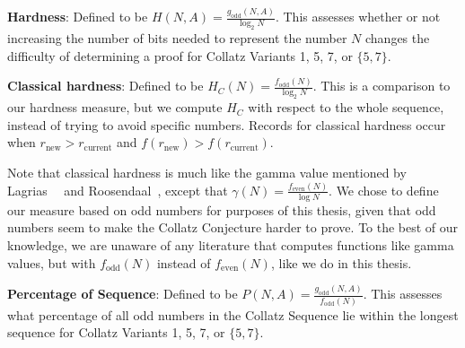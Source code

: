 \textbf{Hardness}: Defined to be $H(N,A) = \frac{g_\text{odd}(N,A)}{\log_2{N}}$. This assesses whether or not increasing the number of bits needed to represent the number $N$ changes the difficulty of determining a proof for Collatz Variants  1, 5, 7, or $\{5,7\}$.  \par
\textbf{Classical hardness}: Defined to be $H_C(N) = \frac{f_\text{odd}(N)}{\log_2{N}}$. This is a comparison to our hardness measure, but we compute $H_C$ with respect to the whole sequence, instead of trying to avoid specific numbers. Records for classical hardness occur when $r_\text{new} > r_\text{current}$ and $f(r_\text{new}) > f(r_\text{current})$. \par
Note that classical hardness is much like the gamma value mentioned by Lagrias~\cite{2003mathLagrais}~\cite{2006mathLagrias} and Roosendaal~\cite{EricRoose}, except that $\gamma(N) = \frac{f_\text{even}(N)}{\log{N}}$. We chose to define our measure based on odd numbers for purposes of this thesis, given that odd numbers seem to make the Collatz Conjecture harder to prove. To the best of our knowledge, we are unaware of any literature that computes functions like gamma values, but with $f_\text{odd}(N)$ instead of $f_\text{even}(N)$, like we do in this thesis.\par
\textbf{Percentage of Sequence}: Defined to be $P(N,A) = \frac{g_\text{odd}(N,A)}{f_\text{odd}(N)}$. This assesses what percentage of all odd numbers in the Collatz Sequence lie within the longest sequence for Collatz Variants 1, 5, 7, or $\{5,7\}$.

